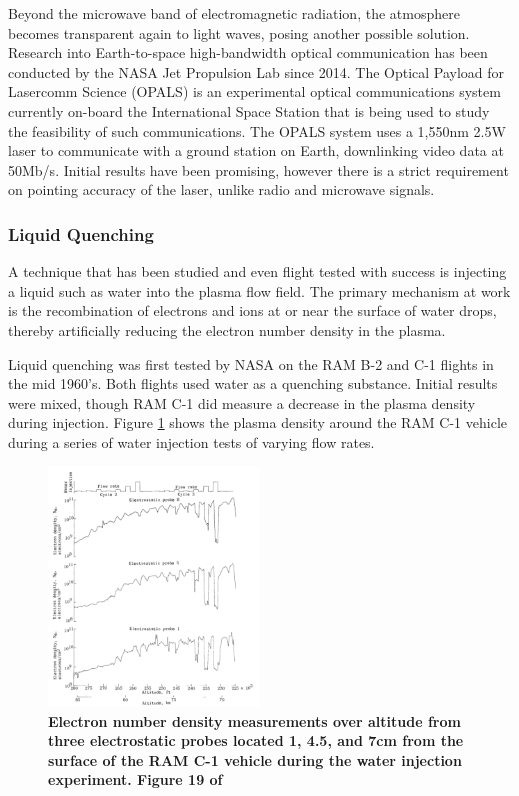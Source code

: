 \documentclass[twocolumn]{article}
\begin{document}
			Beyond the microwave band of electromagnetic radiation, the atmosphere becomes transparent again to light waves, posing another possible solution.
			Research into Earth-to-space high-bandwidth optical communication has been conducted by the NASA Jet Propulsion Lab since 2014.
			The Optical Payload for Lasercomm Science (OPALS) is an experimental optical communications system currently on-board the International Space Station that is being used to study the feasibility of such communications.
			The OPALS system uses a 1,550nm 2.5W laser to communicate with a ground station on Earth, downlinking video data at 50Mb/s.\cite{oaida_optical_2014}
			Initial results have been promising, however there is a strict requirement on pointing accuracy of the laser, unlike radio and microwave signals. \cite{abrahamson_achieving_2015}
		
		\subsubsection*{Liquid Quenching}
			A technique that has been studied and even flight tested with success is injecting a liquid such as water into the plasma flow field.
			The primary mechanism at work is the recombination of electrons and ions at or near the surface of water drops, thereby artificially reducing the electron number density in the plasma.\cite{evans_reduction_1965}
			
			Liquid quenching was first tested by NASA on the RAM B-2 and C-1 flights in the mid 1960's. \cite{rybak_causes_1970}
			Both flights used water as a quenching substance.
			Initial results were mixed, though RAM C-1 did measure a decrease in the plasma density during injection.
			Figure \ref{fig:RAMCWaterInject} shows the plasma density around the RAM C-1 vehicle during a series of water injection tests of varying flow rates.
			
			
			\begin{figure}
				\centering
				\includegraphics[width = 0.5\textwidth]{Images/RAMC_LangmuirWaterFlow.png}
				\caption{\textbf{Electron number density measurements over altitude from three electrostatic probes located 1, 4.5, and 7cm from the surface of the RAM C-1 vehicle during the water injection experiment. Figure 19 of \cite{akey_radio_1970}}}
				\label{fig:RAMCWaterInject}
			\end{figure}
			
\end{document}
